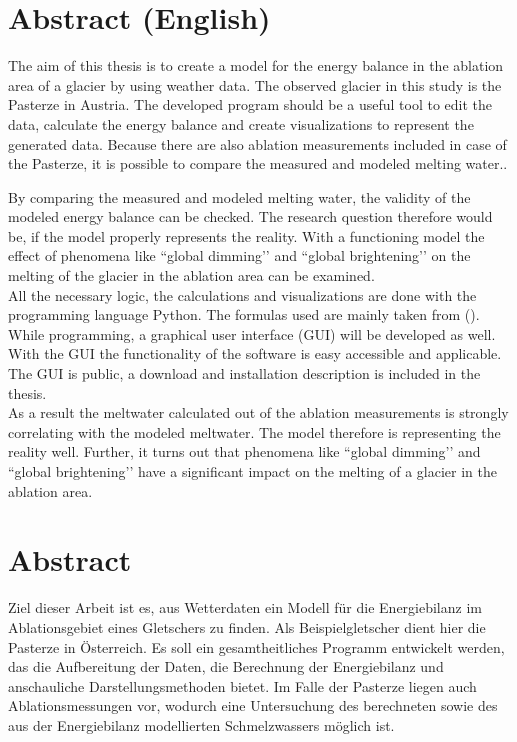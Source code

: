 \documentclass[11pt,a4paper]{article}
\begin{document}
\pagebreak
\ofoot{{\small \pagemark}}
\section*{Abstract (English)}
The aim of this thesis is to create a model for the energy balance in the ablation area of a glacier by using weather data. The observed glacier in this study is the Pasterze in Austria. The developed program should be a useful tool to edit the data, calculate the energy balance and create visualizations to represent the generated data. Because there are also ablation measurements included in case of the Pasterze, it is possible to compare the measured and modeled melting water..

By comparing the measured and modeled melting water, the validity of the modeled energy balance can be checked. The research question therefore would be, if the model properly represents the reality. With a functioning model the effect of phenomena like ``global dimming’’ and ``global brightening’’ on the melting of the glacier in the ablation area can be examined.\\

All the necessary logic, the calculations and visualizations are done with the programming language Python. The formulas used are mainly taken from \citeauthor{ThePhysicsOfGlaciers} (\citeyear[153-157]{ThePhysicsOfGlaciers}). While programming, a graphical user interface (GUI) will be developed as well. With the GUI the functionality of the software is easy accessible and applicable. The GUI is public, a download and installation description is included in the thesis.\\

As a result the meltwater calculated out of the ablation measurements is strongly correlating with  the modeled meltwater. The model therefore is representing the reality well. Further, it turns out that phenomena like ``global dimming’’ and ``global brightening’’ have a significant impact on the melting of a glacier in the ablation area.
 
\pagebreak
\section*{Abstract}

Ziel dieser Arbeit ist es, aus Wetterdaten ein Modell für die Energiebilanz im Ablationsgebiet eines Gletschers zu finden. Als Beispielgletscher dient hier die Pasterze in Österreich. Es soll ein gesamtheitliches Programm entwickelt werden, das die Aufbereitung der Daten, die Berechnung der Energiebilanz und anschauliche Darstellungsmethoden bietet. Im Falle der Pasterze liegen auch Ablationsmessungen vor, wodurch eine Untersuchung des berechneten sowie des aus der Energiebilanz modellierten Schmelzwassers möglich ist.\\
\end{document}
